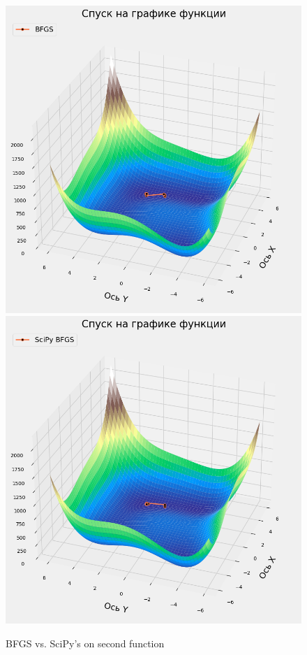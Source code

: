 \documentclass[12pt, a4paper, oneside, final]{article}
\begin{document}
	\begin{figure}[H]
		\centering
		\includegraphics[scale = 0.35]{Image/T2A_F2_BFGS.png}
		\includegraphics[scale = 0.35]{Image/T2A_F2_scipy_BFGS.png}
		\caption*{BFGS vs. SciPy's on second function}
	\end{figure}
\end{document}
